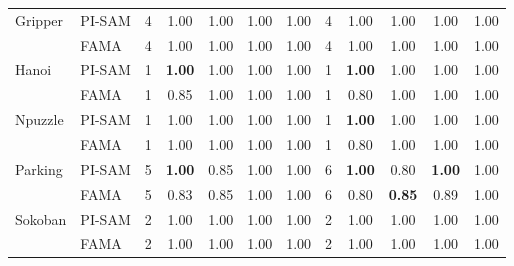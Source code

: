 \documentclass[letterpaper]{article} %
\begin{document}
\begin{table*}[t]
{\begin{tabular}{|l|l|c|c|c|c|c|c|c|c|c|c|}
\multirow{2}{*}{Gripper} & PI-SAM                     & 4               & 1.00            &1.00           & 1.00          &1.00           & 4               &   1.00         &   1.00        &   1.00         &   1.00         \\ 
                        & FAMA                       & 4               & 1.00           & 1.00          & 1.00          &1.00           & 4               &  1.00          & 1.00          & 1.00           &  1.00          \\ 
\hline

\multirow{2}{*}{Hanoi} & PI-SAM                     & 1               & \textbf{1.00}           & 1.00          &  1.00         & 1.00          & 1               & \textbf{ 1.00}          & 1.00          &  1.00          &  1.00          \\ 
                        & FAMA                       & 1               & 0.85           & 1.00          & 1.00          & 1.00          & 1               &  0.80          & 1.00          &  1.00          & 1.00           \\ 
\hline

\multirow{2}{*}{Npuzzle} & PI-SAM                     & 1               & 1.00           & 1.00          &1.00           & 1.00          & 1               &  \textbf{1.00}          &   1.00        &   1.00         &  1.00          \\ 
                        & FAMA                       & 1               & 1.00           & 1.00          & 1.00          & 1.00          & 1               & 0.80           &1.00           & 1.00           &  1.00          \\ 
\hline

\multirow{2}{*}{Parking} & PI-SAM                     & 5               & \textbf{1.00}           & 0.85          & 1.00          & 1.00          & 6               & \textbf{1.00}           & 0.80          & \textbf{1.00}           &  1.00          \\ 
                        & FAMA                       & 5               & 0.83           & 0.85          & 1.00          &  1.00         & 6               & 0.80           & \textbf{0.85}          &  0.89          &  1.00          \\ 
\hline

\multirow{2}{*}{Sokoban} & PI-SAM                     & 2               & 1.00           &1.00           &1.00           &1.00           & 2               &1.00            & 1.00          & 1.00           & 1.00           \\ 
                        & FAMA                       & 2               &1.00            & 1.00          & 1.00          &1.00           & 2               &  1.00          &1.00          & 1.00           &  1.00          \\ 
\hline


\end{tabular}}
\end{table*}
\end{document}
